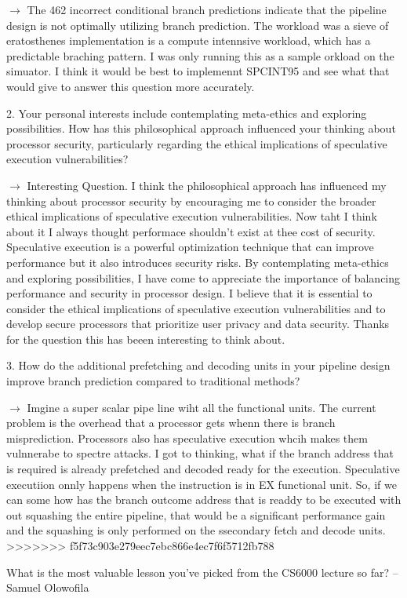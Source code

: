 $\longrightarrow$ The 462 incorrect conditional branch predictions indicate that the pipeline design is not optimally utilizing branch prediction. The workload was a sieve of eratosthenes implementation is a compute intennsive workload, which has a predictable braching pattern. I was only running this as a sample orkload on the simuator. I think it would be best to implemennt SPCINT95 and see what that would give to answer this question more accurately.

2. Your personal interests include contemplating meta-ethics and exploring possibilities. How has this philosophical approach influenced your thinking about processor security, particularly regarding the ethical implications of speculative execution vulnerabilities?

$\longrightarrow$ Interesting Question. I think the philosophical approach has influenced my thinking about processor security by encouraging me to consider the broader ethical implications of speculative execution vulnerabilities. Now taht I think about it I always thought performace shouldn't exist at thee cost of security.
Speculative execution is a powerful optimization technique that can improve performance but it also introduces security risks. By contemplating meta-ethics and exploring possibilities, I have come to appreciate the importance of balancing performance and security in processor design. I believe that it is essential to consider the ethical implications of speculative execution vulnerabilities and to develop secure processors that prioritize user privacy and data security.
Thanks for the question this has beeen interesting to think about. 

3. How do the additional prefetching and decoding units in your pipeline design improve branch prediction compared to traditional methods?

$\longrightarrow$ Imgine a super scalar pipe line wiht all the functional units. The current problem is the overhead that a processor gets whenn there is branch misprediction. Processors also has speculative execution whcih makes them vulnnerabe to spectre attacks. 
I got to thinking, what if the branch address that is required is already prefetched and decoded ready for the execution. Speculative executiion onnly happens when the instruction is in EX functional unit. So, if we can some how has the branch outcome address that is readdy to be executed with out squashing the entire pipeline, that would be a significant performance gain and the squashing is only performed on the ssecondary fetch and decode units. 
>>>>>>> f5f73c903e279eec7ebc866e4ec7f6f5712fb788


What is the most valuable lesson you've picked from the CS6000 lecture so far? -- Samuel Olowofila